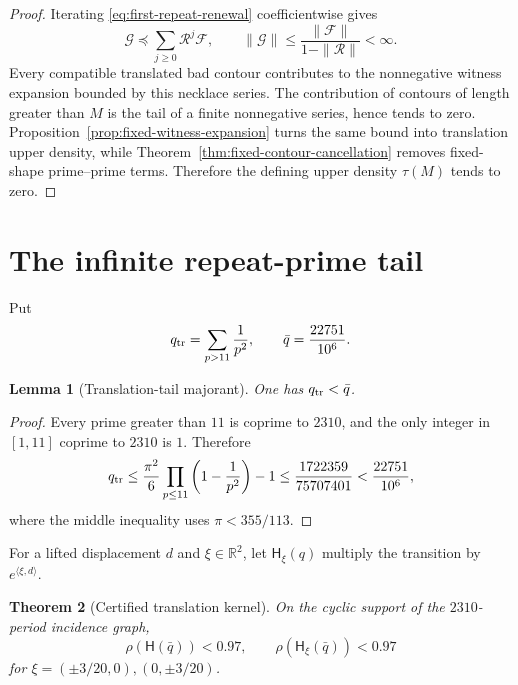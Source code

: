\documentclass[11pt]{article}
\newtheorem{theorem}{Theorem}[section]
\newtheorem{lemma}[theorem]{Lemma}
\theoremstyle{definition}
\theoremstyle{remark}
\begin{document}
\begin{proof}
Iterating \eqref{eq:first-repeat-renewal} coefficientwise gives
\[
 \mathcal G\preccurlyeq\sum_{j\geq0}\mathcal R^j\mathcal F,
 \qquad
 \|\mathcal G\|\leq\frac{\|\mathcal F\|}{1-\|\mathcal R\|}<\infty.
\]
Every compatible translated bad contour contributes to the nonnegative
witness expansion bounded by this necklace series.  The contribution of
contours of length greater than $M$ is the tail of a finite nonnegative
series, hence tends to zero.  Proposition~\ref{prop:fixed-witness-expansion}
turns the same bound into translation upper density, while
Theorem~\ref{thm:fixed-contour-cancellation} removes fixed-shape
prime--prime terms.  Therefore the defining upper density $\tau(M)$ tends to
zero.
\end{proof}

\section{The infinite repeat-prime tail}

Put
\[
 q_{\rm tr}=\sum_{p>11}\frac1{p^2},\qquad
 \bar q=\frac{22751}{10^6}.
\]

\begin{lemma}[Translation-tail majorant]
\label{lem:translation-tail-majorant}
One has $q_{\rm tr}<\bar q$.
\end{lemma}

\begin{proof}
Every prime greater than $11$ is coprime to $2310$, and the only integer in
$[1,11]$ coprime to $2310$ is $1$.  Therefore
\[
 q_{\rm tr}\leq
 \frac{\pi^2}{6}\prod_{p\leq11}\left(1-\frac1{p^2}\right)-1
 \leq\frac{1722359}{75707401}<\frac{22751}{10^6},
\]
where the middle inequality uses $\pi<355/113$.
\end{proof}

For a lifted displacement $d$ and $\xi\in\mathbb R^2$, let
$\mathsf H_\xi(q)$ multiply the transition by $e^{\langle\xi,d\rangle}$.

\begin{theorem}[Certified translation kernel]
\label{thm:certified-translation-kernel}
On the cyclic support of the $2310$-period incidence graph,
\[
 \rho(\mathsf H(\bar q))<0.97,
 \qquad
 \rho(\mathsf H_\xi(\bar q))<0.97
\]
for $\xi=(\pm3/20,0),(0,\pm3/20)$.
\end{theorem}
\end{document}
